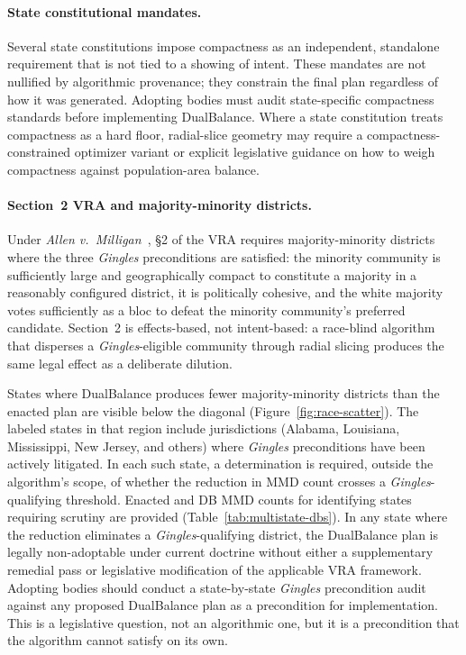 \paragraph{State constitutional mandates.}
Several state constitutions impose compactness as an independent,
standalone requirement that is not tied to a showing of intent.
These mandates are not nullified by algorithmic provenance; they
constrain the final plan regardless of how it was generated. Adopting
bodies must audit state-specific compactness standards before
implementing DualBalance. Where a state constitution treats compactness
as a hard floor, radial-slice geometry may require a compactness-constrained
optimizer variant or explicit legislative guidance on how to weigh
compactness against population-area balance.

\paragraph{Section~2 VRA and majority-minority districts.}
Under \textit{Allen v.~Milligan}~\cite{milligan2023}, \S2 of the VRA
requires majority-minority districts where the three \textit{Gingles}
preconditions are satisfied: the minority community is sufficiently
large and geographically compact to constitute a majority in a
reasonably configured district, it is politically cohesive, and the
white majority votes sufficiently as a bloc to defeat the minority
community's preferred candidate. Section~2 is effects-based, not
intent-based: a race-blind algorithm that disperses a
\textit{Gingles}-eligible community through radial slicing produces
the same legal effect as a deliberate dilution.

States where DualBalance produces fewer majority-minority districts
than the enacted plan are visible below the diagonal
(Figure~\ref{fig:race-scatter}). The labeled states in that region
include jurisdictions (Alabama, Louisiana, Mississippi, New Jersey,
and others) where \textit{Gingles} preconditions have been actively
litigated. In each such state, a determination is required, outside
the algorithm's scope, of whether the reduction in MMD count crosses
a \textit{Gingles}-qualifying threshold. Enacted and DB MMD counts for identifying states requiring scrutiny
are provided (Table~\ref{tab:multistate-dbs}). In any state where the reduction
eliminates a \textit{Gingles}-qualifying district, the DualBalance
plan is legally non-adoptable under current doctrine without either a
supplementary remedial pass or legislative modification of the
applicable VRA framework. Adopting bodies should conduct a
state-by-state \textit{Gingles} precondition audit against any
proposed DualBalance plan as a precondition for implementation.
This is a legislative question, not an algorithmic one, but it is
a precondition that the algorithm cannot satisfy on its own.

